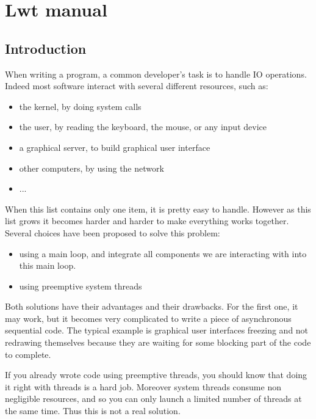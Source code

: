
\chapter{ Lwt manual }
\label{lwt:manual}

\section{ Introduction }

When writing a program, a common developer's task is to handle IO
operations. Indeed most software interact with several different
resources, such as:



\begin{itemize}
\item  the kernel, by doing system calls
\item  the user, by reading the keyboard, the mouse, or any input device
\item  a graphical server, to build graphical user interface
\item  other computers, by using the network
\item  ...

\end{itemize}

When this list contains only one item, it is pretty easy to
handle. However as this list grows it becomes harder and harder to
make everything works together. Several choices have been proposed
to solve this problem:



\begin{itemize}
\item  using a main loop, and integrate all components we are
interacting with into this main loop.
\item  using preemptive system threads

\end{itemize}

Both solutions have their advantages and their drawbacks. For the
first one, it may work, but it becomes very complicated to write
a piece of asynchronous sequential code. The typical example is
graphical user interfaces freezing and not redrawing themselves
because they are waiting for some blocking part of the code to
complete.



If you already wrote code using preemptive threads, you should know
that doing it right with threads is a hard job. Moreover system
threads consume non negligible resources, and so you can only launch
a limited number of threads at the same time. Thus this is not a
real solution.



